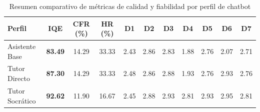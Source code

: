 \begin{table}[htbp]
\centering
\small
\caption{Resumen comparativo de métricas de calidad y fiabilidad por perfil de chatbot}
\label{tab:comparativa_modelos}
\begin{tabular}{lcccccccccc}
\toprule
\textbf{Perfil} & \textbf{IQE} & \textbf{CFR (\%)} & \textbf{HR (\%)} & \textbf{D1} & \textbf{D2} & \textbf{D3} & \textbf{D4} & \textbf{D5} & \textbf{D6} & \textbf{D7} \\
\midrule
Asistente Base & \textbf{83.49} & 14.29 & 33.33 & 2.43 & 2.86 & 2.83 & 1.88 & 2.76 & 2.07 & 2.71 \\
Tutor Directo & \textbf{87.30} & 14.29 & 33.33 & 2.48 & 2.86 & 2.88 & 1.93 & 2.76 & 2.93 & 2.76 \\
Tutor Socrático & \textbf{92.62} & 11.90 & 16.67 & 2.45 & 2.88 & 2.93 & 2.81 & 2.93 & 2.95 & 2.81 \\
\bottomrule
\end{tabular}
\end{table}
